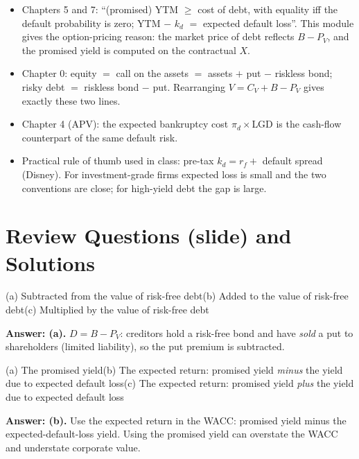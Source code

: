 \begin{addbox}
\begin{itemize}[leftmargin=*]
  \item Chapters 5 and 7: ``(promised) YTM $\geq$ cost of debt, with equality iff the default probability is zero; YTM $-$ $k_d$ $=$ expected default loss''. This module gives the option-pricing reason: the market price of debt reflects $B-P_V$, and the promised yield is computed on the contractual $X$.
  \item Chapter 0: equity $=$ call on the assets $=$ assets $+$ put $-$ riskless bond; risky debt $=$ riskless bond $-$ put. Rearranging $V=C_V+B-P_V$ gives exactly these two lines.
  \item Chapter 4 (APV): the expected bankruptcy cost $\pi_d\times$LGD is the cash-flow counterpart of the same default risk.
  \item Practical rule of thumb used in class: pre-tax $k_d=r_f+$ default spread (Disney). For investment-grade firms expected loss is small and the two conventions are close; for high-yield debt the gap is large.
\end{itemize}
\end{addbox}

\section{Review Questions (slide) and Solutions}

\begin{exbox}
(a) Subtracted from the value of risk-free debt\quad (b) Added to the value of risk-free debt\quad (c) Multiplied by the value of risk-free debt

\textbf{Answer: (a).} $D=B-P_V$: creditors hold a risk-free bond and have \emph{sold} a put to shareholders (limited liability), so the put premium is subtracted.
\end{exbox}
\begin{exbox}
(a) The promised yield\quad (b) The expected return: promised yield \emph{minus} the yield due to expected default loss\quad (c) The expected return: promised yield \emph{plus} the yield due to expected default loss

\textbf{Answer: (b).} Use the expected return in the WACC: promised yield minus the expected-default-loss yield. Using the promised yield can overstate the WACC and understate corporate value.
\end{exbox}


